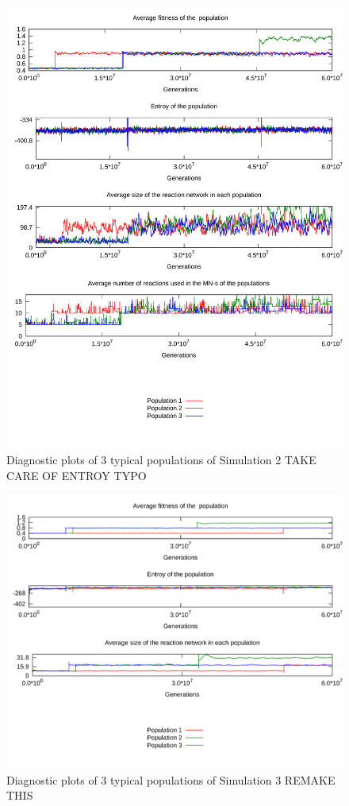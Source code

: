 \documentclass[a4paper,12pt]{article}
\begin{document}
\begin{figure}[htpb]
	\centering
	\includegraphics[width=0.8\linewidth]{simulation2.pdf}
	\caption{Diagnostic plots of 3 typical populations of Simulation 2 TAKE CARE OF ENTROY TYPO}
	\label{fig:simulation2}
\end{figure}

\begin{figure}[htpb]
	\centering
	\includegraphics[width=0.8\linewidth]{simulation3.pdf}
	\caption{Diagnostic plots of 3 typical populations of Simulation 3 REMAKE THIS}
	\label{fig:simulation3}
\end{figure}
\end{document}
